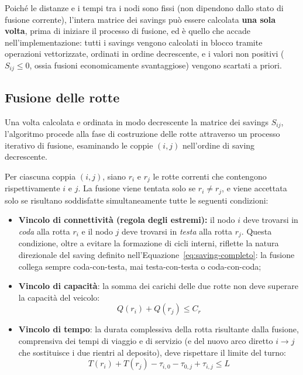 Poiché le distanze e i tempi tra i nodi sono fissi (non dipendono dallo stato di fusione corrente), l'intera matrice dei savings può essere calcolata \textbf{una sola volta}, prima di iniziare il processo di fusione, ed è quello che accade nell'implementazione: tutti i savings vengono calcolati in blocco tramite operazioni vettorizzate, ordinati in ordine decrescente, e i valori non positivi ($S_{ij}\leq 0$, ossia fusioni economicamente svantaggiose) vengono scartati a priori.

\subsection{Fusione delle rotte}

Una volta calcolata e ordinata in modo decrescente la matrice dei savings $S_{ij}$, l'algoritmo procede alla fase di costruzione delle rotte attraverso un processo iterativo di fusione, esaminando le coppie $(i,j)$ nell'ordine di saving decrescente.

Per ciascuna coppia $(i,j)$, siano $r_i$ e $r_j$ le rotte correnti che contengono rispettivamente $i$ e $j$. La fusione viene tentata solo se $r_i \neq r_j$, e viene accettata solo se risultano soddisfatte simultaneamente tutte le seguenti condizioni:

\begin{itemize}
	\item \textbf{Vincolo di connettività (regola degli estremi):} il nodo $i$ deve trovarsi in \emph{coda} alla rotta $r_i$ e il nodo $j$ deve trovarsi in \emph{testa} alla rotta $r_j$. Questa condizione, oltre a evitare la formazione di cicli interni, riflette la natura direzionale del saving definito nell'Equazione~\eqref{eq:saving-completo}: la fusione collega sempre coda-con-testa, mai testa-con-testa o coda-con-coda;
	
	\item \textbf{Vincolo di capacità}: la somma dei carichi delle due rotte non deve superare la capacità del veicolo:
	\[
	Q(r_i) + Q(r_j) \leq C_r
	\]
	
	\item \textbf{Vincolo di tempo}: la durata complessiva della rotta risultante dalla fusione, comprensiva dei tempi di viaggio e di servizio (e del nuovo arco diretto $i \rightarrow j$ che sostituisce i due rientri al deposito), deve rispettare il limite del turno:
	\[
	T(r_i) + T(r_j) - \tau_{i,0} - \tau_{0,j} + \tau_{i,j} \leq L
	\]
\end{itemize}

